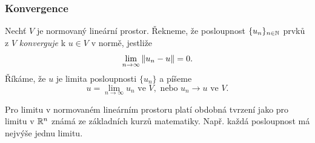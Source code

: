 % 







\subsubsection{Konvergence}
% 
\begin{df}
Nechť $V$ je normovaný lineární prostor. Řekneme, že posloupnost $\{u_n\}_{n\in\mathbb N}$ prvků z $V$ \emph{konverguje} k $u\in V$ v normě, jestliže
\[ \lim_{n\rightarrow\infty} \|u_n-u\| = 0. \]
Říkáme, že $u$ je limita posloupnosti $\{u_n\}$ a píšeme
\[ u=\lim_{n\to\infty} u_n \mbox{ ve }V, \mbox{ nebo }u_n\to u \mbox{ ve }V. \]
\end{df}
% 
Pro limitu v normovaném lineárním prostoru platí obdobná tvrzení jako pro limitu v $\mathbb R^n$ známá ze základních kurzů matematiky.
Např. každá posloupnost má nejvýše jednu limitu.

